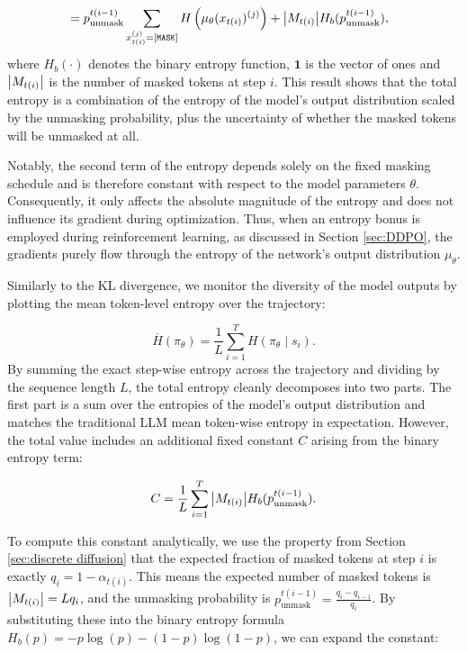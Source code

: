 {\begin{align}
         & = p_{\text{unmask}}^{t(i - 1)} \sum_{x_{t(i)}^{(j)} = [\mathtt{MASK}]} H\left(\mu_\theta(x_{t(i)})^{(j)}\right) + \abs{M_{t(i)}} H_b(p_{\text{unmask}}^{t(i - 1)}),
        \label{eq:entropy bonus}
    \end{align}
}where $H_b(\cdot)$ denotes the binary entropy function, $\mathbf{1}$ is the vector of ones and $\abs{M_{t(i)}}$ is the number of masked tokens at step $i$. This result shows that the total entropy is a combination of the entropy of the model's output distribution scaled by the unmasking probability, plus the uncertainty of whether the masked tokens will be unmasked at all.

Notably, the second term of the entropy depends solely on the fixed masking schedule and is therefore constant with respect to the model parameters $\theta$. Consequently, it only affects the absolute magnitude of the entropy and does not influence its gradient during optimization. Thus, when an entropy bonus is employed during reinforcement learning, as discussed in Section \ref{sec:DDPO}, the gradients purely flow through the entropy of the network's output distribution $\mu_\theta$.

Similarly to the KL divergence, we monitor the diversity of the model outputs by plotting the mean token-level entropy over the trajectory:

\begin{equation}
    \overline{H}(\pi_\theta) = \frac{1}{L} \sum_{i=1}^{T} H(\pi_\theta \mid s_i).
    \label{eq:mean entropy}
\end{equation}
By summing the exact step-wise entropy across the trajectory and dividing by the sequence length $L$, the total entropy cleanly decomposes into two parts. The first part is a sum over the entropies of the model's output distribution and matches the traditional LLM mean token-wise entropy in expectation. However, the total value includes an additional fixed constant $C$ arising from the binary entropy term:

\begin{equation}
    C = \frac{1}{L} \sum_{i=1}^{T} \abs{M_{t(i)}} H_b(p_{\text{unmask}}^{t(i - 1)}).
\end{equation}

To compute this constant analytically, we use the property from Section \ref{sec:discrete diffusion} that the expected fraction of masked tokens at step $i$ is exactly $q_i = 1 - \alpha_{t(i)}$. This means the expected number of masked tokens is $\abs{M_{t(i)}} = L q_i$, and the unmasking probability is $p_{\text{unmask}}^{t(i - 1)} = \frac{q_i - q_{i-1}}{q_i}$. By substituting these into the binary entropy formula $H_b(p) = -p\log(p) - (1-p)\log(1-p)$, we can expand the constant:

